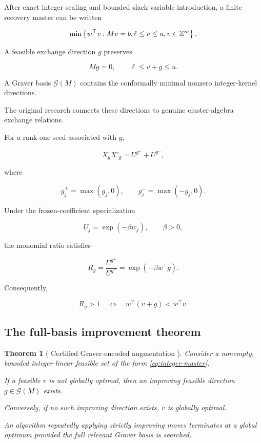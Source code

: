 \documentclass[10pt,a4paper]{article}
\newcommand{\ZZ}{\mathbb{Z}}
\theoremstyle{plain}
\newtheorem{theorem}{Theorem}[section]
\theoremstyle{definition}
\theoremstyle{remark}
\begin{document}
After exact integer scaling and
bounded slack-variable introduction,
a finite recovery master can be written

\begin{equation}
\min
\left\{
w^\top v:
Mv=b,\space{}
\ell\leq v\leq u,\space{}
v\in\ZZ^m
\right\}.
\label{eq:integer-master}
\end{equation}

A feasible exchange direction \(g\)
preserves

\begin{equation}
Mg=0,
\qquad
\ell\leq v+g\leq u.
\label{eq:kernel}
\end{equation}

A Graver basis
\(\mathcal G(M)\)
contains the conformally minimal
nonzero integer-kernel directions.

The original research connects
these directions to genuine
cluster-algebra exchange relations.

For a rank-one seed associated with \(g\),

\begin{equation}
X_gX'_g
=
U^{g^+}+U^{g^-},
\label{eq:cluster}
\end{equation}

where

\[
g_j^+=\max(g_j,0),
\qquad
g_j^-=\max(-g_j,0).
\]

Under the frozen-coefficient specialization

\[
U_j=\exp(-\beta w_j),
\qquad
\beta>0,
\]

the monomial ratio satisfies

\begin{equation}
R_g
=
\frac{U^{g^+}}{U^{g^-}}
=
\exp(-\beta w^\top g).
\label{eq:mutation-gain}
\end{equation}

Consequently,

\[
R_g>1
\quad\Longleftrightarrow\quad
w^\top(v+g)<w^\top v.
\]

\subsection{The full-basis improvement theorem}

\begin{theorem}[
Certified Graver-encoded augmentation
\cite{relaymodel3}
]
Consider a nonempty, bounded integer-linear
feasible set of the form
\eqref{eq:integer-master}.

If a feasible \(v\) is not globally optimal,
then an improving feasible direction
\(g\in\mathcal G(M)\) exists.

Conversely, if no such improving direction exists,
\(v\) is globally optimal.

An algorithm repeatedly applying
strictly improving moves terminates
at a global optimum provided
the full relevant Graver basis is searched.
\end{theorem}
\end{document}
